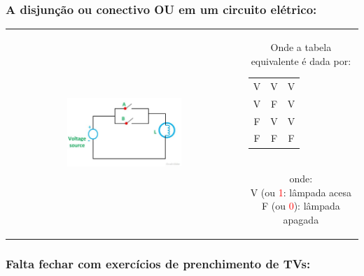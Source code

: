\documentclass{beamer}
\begin{document}
\begin{frame}
\frametitle{A \textbf{disjunção} ou conectivo \textbf{OU}  em um circuito elétrico:}

\begin{tabular}{c||c}  
 
 \includegraphics[height=0.5\textheight,width=0.5\textwidth]{figuras/circuito_OR.jpg} 
 
  &
  \parbox{0.4\linewidth}{\vspace{-4cm} Onde a tabela equivalente é dada por:\\
  	\begin{tabular}{|c|c|c|}
	\hline
	$\mathbf{A}$ & $\mathbf{B}$ & $\mathbf{A \vee B}$ \\
	\hline
	V & V & V \\
	\hline
	V & F & V \\
	\hline
	F & V & V \\
	\hline
	F & F & F \\
	\hline
	\end{tabular}\\
  onde:\\
	V (ou  \textcolor{red}{1}: lâmpada acesa\\
	F (ou \textcolor{red}{0}): lâmpada apagada\\

  } %

\end{tabular} 	

\end{frame}


\begin{frame}
\frametitle{Falta fechar com exercícios de prenchimento de TVs:}

\end{frame}
\end{document}
